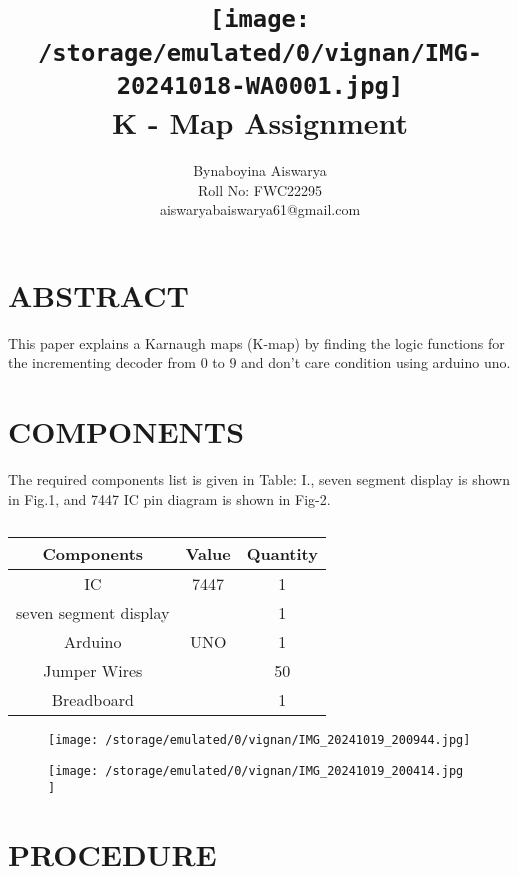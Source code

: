 \documentclass[conference]{IEEEtran}
\title{
\vspace{1cm}
{\texttt{[image:    /storage/emulated/0/vignan/IMG-20241018-WA0001.jpg]} \\ K - Map Assignment} }
\author{Bynaboyina Aiswarya \\ Roll No: FWC22295 \\ aiswaryabaiswarya61@gmail.com}
\begin{document}
\maketitle
 \section {ABSTRACT}
 This paper explains a Karnaugh maps (K-map) by finding the logic functions for the incrementing decoder from $0$ to $9$ and don't care condition using arduino uno.

\section{COMPONENTS}
The required components list is given in Table: I., seven segment display is shown in Fig.1, and 7447 IC pin diagram is shown in Fig-2.
\vspace{0.3cm}
 \begin{table} [htbp]
\centering
\begin{tabular}{| c | c | c |} \hline
Components & Value & Quantity \\\hline
IC & 7447 & 1 \\ \hline
seven segment display & & 1\\ \hline
Arduino & UNO & 1 \\ \hline
Jumper Wires &  & 50 \\ \hline
Breadboard & & 1 \\ 
\hline
\end{tabular}
\vspace{0.3cm}
\caption{\label{tab:widgets}}
\end{table}

\begin{figure}[h]                           
\centering                                 
\texttt{[image:  /storage/emulated/0/vignan/IMG\_20241019\_200944.jpg]}                                           
\caption{\label{fig-1:Gates}}               
\end{figure}

\begin{figure}[h]                           
\centering                                 
\texttt{[image:    /storage/emulated/0/vignan/IMG\_20241019\_200414.jpg ]}                                           
\caption{\label{fig-2:Gates}}               
\end{figure}

\section{PROCEDURE}
\end{document}
